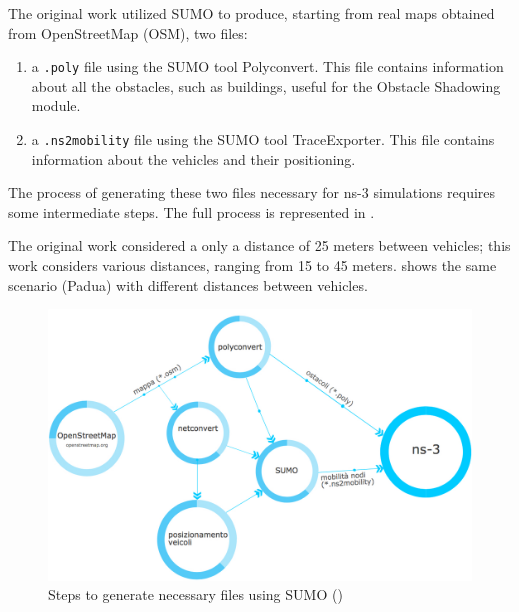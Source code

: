 		The original work \cite{ROM2017} utilized SUMO to produce, starting from real maps obtained from OpenStreetMap (OSM), two files:
		\begin{enumerate}
			\item a \texttt{.poly} file using the SUMO tool Polyconvert. This file contains information about all the obstacles, such as buildings, useful for the Obstacle Shadowing module.
			\item a \texttt{.ns2mobility} file using the SUMO tool TraceExporter. This file contains information about the vehicles and their positioning. 
		\end{enumerate}
		The process of generating these two files necessary for ns-3 simulations requires some intermediate steps. The full process is represented in . 
		
		The original work considered a only a distance of 25 meters between vehicles; this work considers various distances, ranging from 15 to 45 meters.   shows the same scenario (Padua) with different distances between vehicles.

		\begin{figure}[H]
			\centering
			\includegraphics[width=\textwidth]{immagini/sumo-process}
			\caption{Steps to generate necessary files using SUMO (\cite{ROM2017})}
			\label{fig:sumo-process}
		\end{figure}
		
